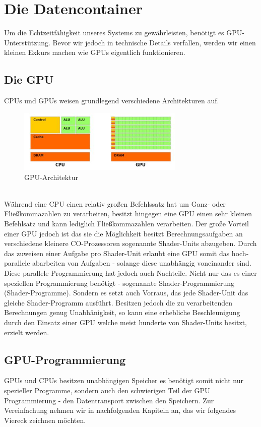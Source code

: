 \section{Die Datencontainer}
\begin{Spacing}{\mylinespace}
Um die Echtzeitfähigkeit unseres Systems zu gewährleisten, benötigt es GPU-Unterstützung.
Bevor wir jedoch in technische Details verfallen, werden wir einen kleinen Exkurs machen wie GPUs eigentlich funktionieren.
\subsection{Die GPU}
CPUs und GPUs weisen grundlegend verschiedene Architekturen auf.
\begin{figure}[h!]
	\vspace*{30px}
	\centering
	\includegraphics[width=300px]{graphics/GPUvsCPU.jpg}	
	\caption{GPU-Architektur\protect\footnotemark}
	\label{fig:GPUvsCPU}
\end{figure}
\\
Während eine CPU einen relativ großen Befehlssatz hat um Ganz- oder Fließkommazahlen zu verarbeiten, besitzt hingegen eine GPU einen sehr kleinen Befehlsatz und kann lediglich Fließkommazahlen verarbeiten.
Der große Vorteil einer GPU jedoch ist das sie die Möglichkeit besitzt Berechnungsaufgaben an verschiedene kleinere CO-Prozessoren sogenannte Shader-Units abzugeben.
Durch das zuweisen einer Aufgabe pro Shader-Unit erlaubt eine GPU somit das hoch-parallele abarbeiten von Aufgaben - solange diese unabhängig voneinander sind.
Diese parallele Programmierung hat jedoch auch Nachteile.
Nicht nur das es einer speziellen Programmierung benötigt - sogenannte Shader-Programmierung (Shader-Programme).
Sondern es setzt auch Vorraus, das jede Shader-Unit das gleiche Shader-Programm ausführt.
Besitzen jedoch die zu verarbeitenden Berechnungen genug Unabhänigkeit, so kann eine erhebliche Beschleunigung durch den Einsatz einer GPU welche meist hunderte von Shader-Units besitzt, erzielt werden.


\subsection{GPU-Programmierung}
GPUs und CPUs besitzen unabhängigen Speicher es benötigt somit nicht nur spezieller Programme, sondern auch den schwierigen Teil der GPU Programmierung - den Datentransport zwischen den Speichern.
Zur Vereinfachung nehmen wir in nachfolgenden Kapiteln an, das wir folgendes Viereck zeichnen möchten.


\end{Spacing}
